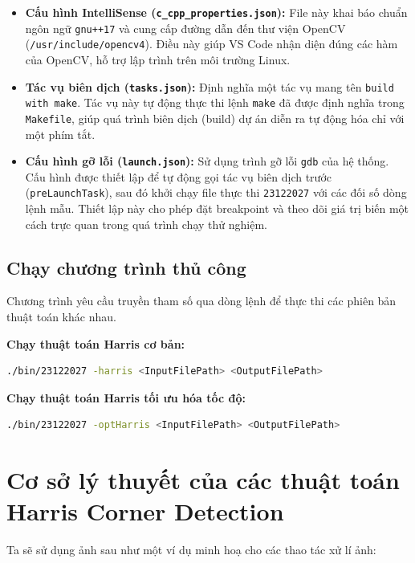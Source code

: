 \begin{itemize}
    \item \textbf{Cấu hình IntelliSense (\texttt{c\_cpp\_properties.json}):} 
    File này khai báo chuẩn ngôn ngữ \texttt{gnu++17} và cung cấp đường dẫn đến thư viện OpenCV (\texttt{/usr/include/opencv4}). Điều này giúp VS Code nhận diện đúng các hàm của OpenCV, hỗ trợ lập trình trên môi trường Linux.
    
    \item \textbf{Tác vụ biên dịch (\texttt{tasks.json}):} 
    Định nghĩa một tác vụ mang tên \texttt{build with make}. Tác vụ này tự động thực thi lệnh \texttt{make} đã được định nghĩa trong \texttt{Makefile}, giúp quá trình biên dịch (build) dự án diễn ra tự động hóa chỉ với một phím tắt.
    
    \item \textbf{Cấu hình gỡ lỗi (\texttt{launch.json}):} 
    Sử dụng trình gỡ lỗi \texttt{gdb} của hệ thống. Cấu hình được thiết lập để tự động gọi tác vụ biên dịch trước (\texttt{preLaunchTask}), sau đó khởi chạy file thực thi \texttt{23122027} với các đối số dòng lệnh mẫu. Thiết lập này cho phép đặt breakpoint và theo dõi giá trị biến một cách trực quan trong quá trình chạy thử nghiệm.
\end{itemize}

\subsection{Chạy chương trình thủ công}
Chương trình yêu cầu truyền tham số qua dòng lệnh để thực thi các phiên bản thuật toán khác nhau.

\textbf{Chạy thuật toán Harris cơ bản:}
\begin{lstlisting}[language=bash, frame=single]
./bin/23122027 -harris <InputFilePath> <OutputFilePath>
\end{lstlisting}

\textbf{Chạy thuật toán Harris tối ưu hóa tốc độ:}
\begin{lstlisting}[language=bash, frame=single]
./bin/23122027 -optHarris <InputFilePath> <OutputFilePath>
\end{lstlisting}

\section{Cơ sở lý thuyết của các thuật toán Harris Corner Detection}

Ta sẽ sử dụng ảnh sau như một ví dụ minh hoạ cho các thao tác xử lí ảnh:

